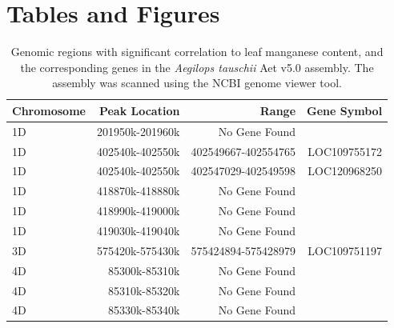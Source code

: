 \documentclass[12pt, letterpaper]{report}
\begin{document}
\section{Tables and Figures}

\begin{table}[ht]
        \centering
        \caption{Genomic regions with significant correlation to leaf manganese content, and the corresponding genes in the \textit{Aegilops tauschii} Aet v5.0 assembly. The assembly was scanned using the NCBI genome viewer tool.}
        \label{Tab:peaks_and_genes}
        \begin{tabular}{lrrr}
        \hline
        \textbf{Chromosome} & \textbf{Peak Location} & \textbf{Range} & \textbf{Gene Symbol} \\
        \hline
        1D         & 201950k-201960k   & No Gene Found          &                 \\
        1D         & 402540k-402550k   & 402549667-402554765    & LOC109755172    \\
        1D         & 402540k-402550k   & 402547029-402549598    & LOC120968250    \\
        1D         & 418870k-418880k   & No Gene Found          &                 \\
        1D         & 418990k-419000k   & No Gene Found          &                 \\
        1D         & 419030k-419040k   & No Gene Found          &                 \\
        3D         & 575420k-575430k   & 575424894-575428979    & LOC109751197    \\
        4D         & 85300k-85310k     & No Gene Found          &                 \\
        4D         & 85310k-85320k     & No Gene Found          &                 \\
        4D         & 85330k-85340k     & No Gene Found          &                 \\
        \hline
        \end{tabular}
\end{table}
        
\end{document}
